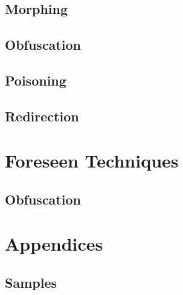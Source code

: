 \documentclass[11pt,fleqn,oneside]{book} %
\begin{document}
\chapter{Morphing} \label{ch:known-morphing}

\chapter{Obfuscation} \label{ch:known-obfuscation}



\chapter{Poisoning} \label{ch:known-poisoning}

\chapter{Redirection} \label{ch:known-redirection}



\part{Foreseen Techniques}
\chapter{Obfuscation} \label{ch:foreseen-obfuscation}


\renewcommand{\thechapter}{\Alph{chapter}}
\renewcommand{\thesection}{\Alph{chapter}.\Roman{section}}
\renewcommand{\thesubsection}{\Alph{chapter}.\Roman{section}.\alph{subsection}}
\part{Appendices}
\chapter{Samples}

\newpage\printbibliography[title = {Resources}]
\end{document}
